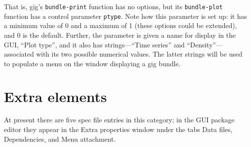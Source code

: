 \documentclass[oneside]{book}
\begin{document}
That is, \textsf{gig}'s \texttt{bundle-print} function has no options,
but its \texttt{bundle-plot} function has a control parameter
\texttt{ptype}. Note how this parameter is set up: it has a minimum
value of 0 and a maximum of 1 (these options could be extended), and 0
is the default. Further, the parameter is given a name for display in
the GUI, ``Plot type'', and it also has strings---``Time series'' and
``Density''---associated with its two possible numerical values. The
latter strings will be used to populate a menu on the window
displaying a \textsf{gig} bundle.

\section{Extra elements}
\label{sec:spec-extra}

At present there are five spec file entries in this category; in the
GUI package editor they appear in the \textsf{Extra properties} window
under the tabs \textsf{Data files}, \textsf{Dependencies}, and
\textsf{Menu attachment}.
\end{document}
